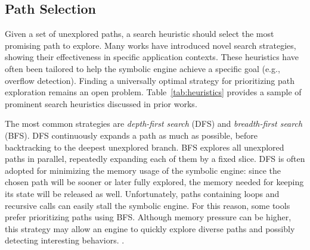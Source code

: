 \subsection{Path Selection}
\label{ss:heuristics}


Given a set of unexplored paths, a search heuristic should select the most promising path to explore. Many works have introduced novel search strategies, showing their effectiveness in specific application contexts. These heuristics have often been tailored to help the symbolic engine achieve a specific goal (e.g., overflow detection). Finding a universally optimal strategy for prioritizing path exploration remains an open problem. Table~\ref{tab:heuristics} provides a sample of prominent search heuristics discussed in prior works. 

The most common strategies are {\em depth-first search} (DFS) and {\em breadth-first search} (BFS). DFS continuously expands a path as much as possible, before backtracking to the deepest unexplored branch. BFS explores all unexplored paths in parallel, repeatedly expanding each of them by a fixed slice. DFS is often adopted for minimizing the memory usage of the symbolic engine: since the chosen path will be sooner or later fully explored, the memory needed for keeping its state will be released as well. Unfortunately, paths containing loops and recursive calls can easily stall the symbolic engine. For this reason, some tools prefer prioritizing paths using BFS. Although memory pressure can be higher, this strategy may allow an engine to quickly explore diverse paths and possibly detecting interesting behaviors. .

